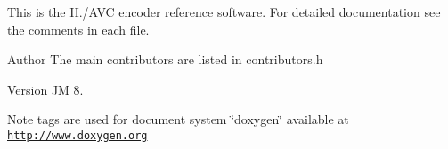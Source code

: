 This is the H./\+A\+V\+C encoder reference software. For detailed documentation see the comments in each file.

\begin{DoxyAuthor}{Author}
The main contributors are listed in contributors.\+h
\end{DoxyAuthor}
\begin{DoxyVersion}{Version}
J\+M 8.
\end{DoxyVersion}
\begin{DoxyNote}{Note}
tags are used for document system \char`\"{}doxygen\char`\"{} available at \href{http://www.doxygen.org}{\tt http\+://www.\+doxygen.\+org} 
\end{DoxyNote}
